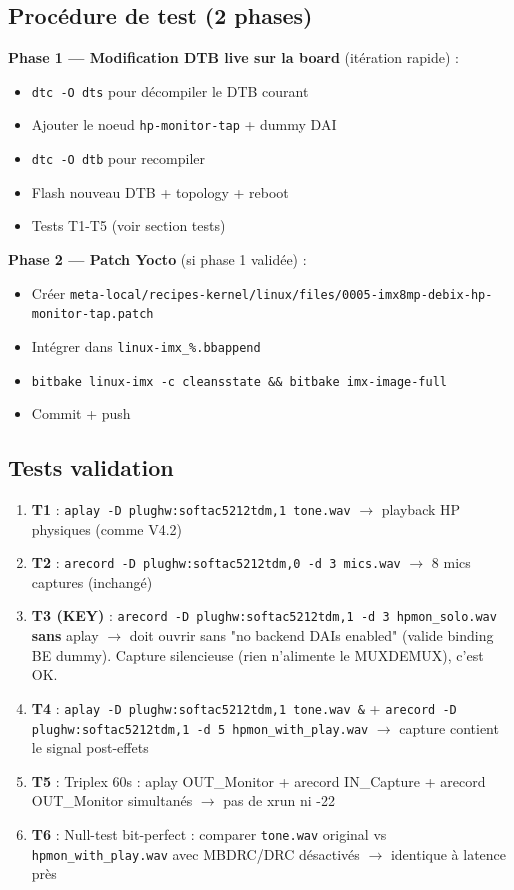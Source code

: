 \documentclass[11pt,a4paper]{article}
\begin{document}
\subsection{Procédure de test (2 phases)}

\textbf{Phase 1 — Modification DTB live sur la board} (itération rapide) :
\begin{itemize}[leftmargin=*, itemsep=1pt]
  \item \texttt{dtc -O dts} pour décompiler le DTB courant
  \item Ajouter le noeud \texttt{hp-monitor-tap} + dummy DAI
  \item \texttt{dtc -O dtb} pour recompiler
  \item Flash nouveau DTB + topology + reboot
  \item Tests T1-T5 (voir section tests)
\end{itemize}

\textbf{Phase 2 — Patch Yocto} (si phase 1 validée) :
\begin{itemize}[leftmargin=*, itemsep=1pt]
  \item Créer \texttt{meta-local/recipes-kernel/linux/files/0005-imx8mp-debix-hp-monitor-tap.patch}
  \item Intégrer dans \texttt{linux-imx\_\%.bbappend}
  \item \texttt{bitbake linux-imx -c cleansstate \&\& bitbake imx-image-full}
  \item Commit + push
\end{itemize}

\subsection{Tests validation}

\begin{enumerate}[leftmargin=*, itemsep=2pt]
  \item \textbf{T1} : \texttt{aplay -D plughw:softac5212tdm,1 tone.wav} $\to$ playback HP physiques (comme V4.2)
  \item \textbf{T2} : \texttt{arecord -D plughw:softac5212tdm,0 -d 3 mics.wav} $\to$ 8 mics captures (inchangé)
  \item \textbf{T3 (KEY)} : \texttt{arecord -D plughw:softac5212tdm,1 -d 3 hpmon\_solo.wav} \textbf{sans} aplay $\to$ doit ouvrir sans "no backend DAIs enabled" (valide binding BE dummy). Capture silencieuse (rien n'alimente le MUXDEMUX), c'est OK.
  \item \textbf{T4} : \texttt{aplay -D plughw:softac5212tdm,1 tone.wav \&} + \texttt{arecord -D plughw:softac5212tdm,1 -d 5 hpmon\_with\_play.wav} $\to$ capture contient le signal post-effets
  \item \textbf{T5} : Triplex 60s : aplay OUT\_Monitor + arecord IN\_Capture + arecord OUT\_Monitor simultanés $\to$ pas de xrun ni -22
  \item \textbf{T6} : Null-test bit-perfect : comparer \texttt{tone.wav} original vs \texttt{hpmon\_with\_play.wav} avec MBDRC/DRC désactivés $\to$ identique à latence près
\end{enumerate}
\end{document}
